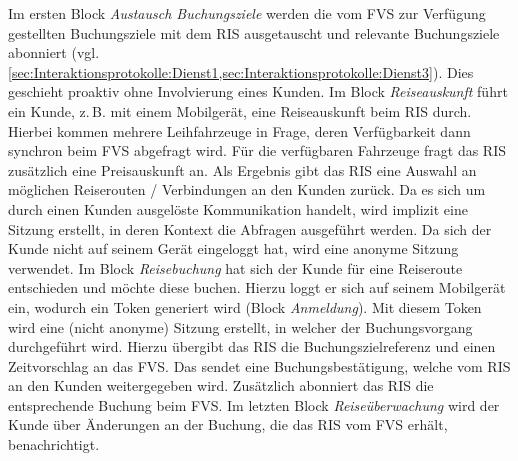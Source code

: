 Im ersten Block \textit{Austausch Buchungsziele} werden die vom FVS zur Verfügung gestellten Buchungsziele mit dem RIS ausgetauscht und relevante Buchungsziele abonniert (vgl. \cref{sec:Interaktionsprotokolle:Dienst1,sec:Interaktionsprotokolle:Dienst3}). Dies geschieht proaktiv ohne Involvierung eines Kunden.
Im Block \textit{Reiseauskunft} führt ein Kunde, z.\,B. mit einem Mobilgerät, eine Reiseauskunft beim RIS durch. Hierbei kommen mehrere Leihfahrzeuge in Frage, deren Verfügbarkeit dann synchron beim FVS abgefragt wird. Für die verfügbaren Fahrzeuge fragt das RIS zusätzlich eine Preisauskunft an. Als Ergebnis gibt das RIS eine Auswahl an möglichen Reiserouten / Verbindungen an den Kunden zurück. Da es sich um durch einen Kunden ausgelöste Kommunikation handelt, wird implizit eine Sitzung erstellt, in deren Kontext die Abfragen ausgeführt werden. Da sich der Kunde nicht auf seinem Gerät eingeloggt hat, wird eine anonyme Sitzung verwendet.
Im Block \textit{Reisebuchung} hat sich der Kunde für eine Reiseroute entschieden und möchte diese buchen. Hierzu loggt er sich auf seinem Mobilgerät ein, wodurch ein Token generiert wird (Block \emph{Anmeldung}). Mit diesem Token wird eine (nicht anonyme) Sitzung erstellt, in welcher der Buchungsvorgang durchgeführt wird. Hierzu übergibt das RIS die Buchungszielreferenz und einen Zeitvorschlag an das FVS. Das sendet eine Buchungsbestätigung, welche vom RIS an den Kunden weitergegeben wird. Zusätzlich abonniert das RIS die entsprechende Buchung beim FVS.
Im letzten Block \textit{Reiseüberwachung} wird der Kunde über Änderungen an der Buchung, die das RIS vom FVS erhält, benachrichtigt.
